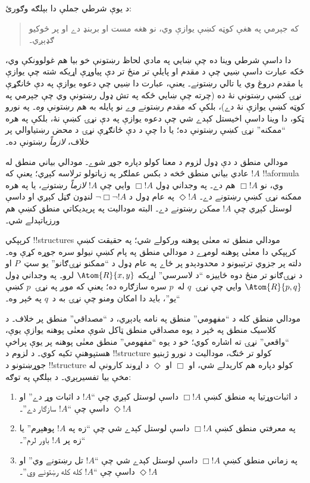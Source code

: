 \documentclass[../../../include/open-logic-section]{subfiles}
\begin{document}


د يوې شرطي جملې دا بېلګه وګورئ:
\begin{quote}
  که جېرمي په هغې کوټه کښې يوازې وي، نو هغه مست او بربنډ دے او پر
  څوکيو ګډېږي۔
\end{quote}
دا داسې شرطي وينا ده چې ښايي په مادي لحاظ رښتونې خو بيا هم
غولوونکې وي، ځکه عبارت داسې ښيي چې د مقدم او پايلې تر منځ تر دې
پياوړې اړيکه شته چې يوازې يا مقدم دروغ وي يا تالي رښتونے۔ يعنې، عبارت
دا ښيي چې دعوه يوازې په دې ځانګړې نړۍ کښې رښتونې نۀ ده (چرته چې
ښايي ځکه په تش ډول رښتونې وي چې جېرمي په کوټه کښې يوازې نۀ دے)، بلکې
که مقدم رښتونے \emph{وے} نو پايله به هم رښتونې \emph{وه}۔ په نورو
ټکو، دا وينا داسې اخيستل کېدے شي چې دعوه يوازې په دې نړۍ کښې نۀ، بلکې
په هره ``ممکنه'' نړۍ کښې رښتونې ده؛ يا دا چې د دې ځانګړې نړۍ د محض
رښتياوالي پر خلاف، \emph{لازماً} رښتونې ده۔

مودالي منطق د دې ډول لزوم د معنا کولو دپاره جوړ شوے۔ مودالي بياني
منطق له عادي بياني منطق څخه د بکس عملګر په زياتولو ترلاسه کېږي؛ يعنې
که $!A$ !!a{formula} وي، نو $\Box !A$ هم دے۔ په وجداني ډول $\Box !A$
وايي چې $!A$ \emph{لازماً} رښتونے، يا په هره ممکنه نړۍ کښې رښتونے
دے۔ $\Diamond !A$ په عام ډول د $\lnot \Box \lnot !A$ لنډون ګڼل کېږي
او داسې لوستل کېږي چې $!A$ \emph{ممکن} رښتونے دے۔ البته موداليت په
پريديکاتي منطق کښې هم ورزياتېدلے شي۔

کرېپکي !!{structure}s مودالي منطق ته معنٰی پوهنه ورکولے شي؛ په حقيقت
کښې کرېپکي دا معنٰی پوهنه لومړے د مودالي منطق په پام کښې نيولو سره
جوړه کړې وه۔ دلته پر جزوي ترتيبونو د محدودېدو پر ځاے په عام ډول د
``ممکنو نړۍګانو'' يو سټ~$P$ او د نړۍګانو تر منځ دوه ځاييزه
``د لاسرسي'' اړيکه $\Atom{R}{x,y}$ لرو۔ په وجداني ډول
$\Atom{R}{p,q}$ وايي چې نړۍ~$q$ له~$p$ سره سازګاره ده؛ يعنې که موږ
په نړۍ~$p$ کښې ``يو''، بايد دا امکان ومنو چې نړۍ به د~$q$ په څېر وه۔

مودالي منطق کله د ``مفهومي'' منطق په نامه يادېږي، د ``مصداقي'' منطق
پر خلاف۔ د کلاسیک منطق په څېر د يوه مصداقي منطق ټاکل شوې معنٰی پوهنه
يوازې يوې، ``واقعي'' نړۍ ته اشاره کوي؛ خو د يوه ``مفهومي'' منطق معنٰی
پوهنه پر يوې پراخې هستپوهنې تکيه کوي۔ د لزوم د !!{structure} کولو تر
څنګ، موداليت د نورو ژبنيو جوړښتونو د !!{structure} کولو دپاره هم
کارېدلے شي، او $\Box$ او $\Diamond$ د اړوند کارونې له مخې بيا تفسيرېږي۔
د بېلګې په توګه:
\begin{enumerate}
\item د اثبات‌وړتيا په منطق کښې $\Box !A$ داسې لوستل کېږي چې ``$!A$
  د اثبات وړ دے'' او $\Diamond !A$ داسې چې ``$!A$ سازګار دے''۔
\item په معرفتي منطق کښې $\Box !A$ داسې لوستل کېدے شي چې ``زه په
  $!A$ پوهېږم'' يا ``زه پر $!A$ باور لرم''۔
\item په زماني منطق کښې $\Box !A$ داسې لوستل کېدے شي چې ``$!A$ تل
  رښتونے وي'' او $\Diamond !A$ داسې چې ``$!A$ کله کله رښتونے وي''۔
\end{enumerate}
\end{document}
